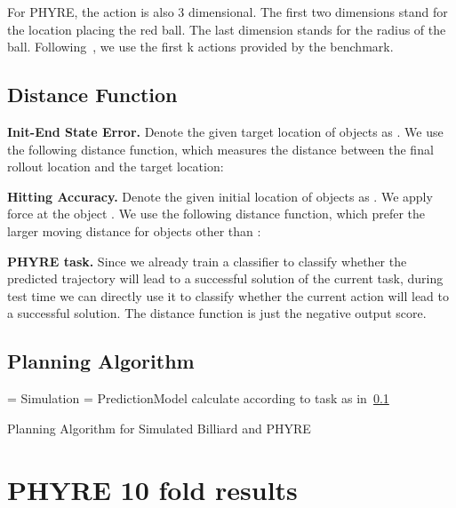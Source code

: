 \documentclass{article} \usepackage{iclr2021_conference,times}
\begin{document}
For PHYRE, the action is also 3 dimensional. The first two dimensions stand for the location placing the red ball. The last dimension stands for the radius of the ball. Following~\citep{bakhtin2019phyre}, we use the first k actions provided by the benchmark.

\subsection{Distance Function}
\label{sec:dist}

\textbf{Init-End State Error.} Denote the given target location of  objects as . We use the following distance function, which measures the distance between the final rollout location and the target location:
\vspace{-0.8em}

\vspace{-0.8em}

\textbf{Hitting Accuracy.} Denote the given initial location of  objects as . We apply force at the object . We use the following distance function, which prefer the larger moving distance for objects other than :
\vspace{-0.8em}

\vspace{-0.8em}

\textbf{PHYRE task.} 
Since we already train a classifier to classify whether the predicted trajectory will lead to a successful solution of the current task, during test time we can directly use it to classify whether the current action will lead to a successful solution. The distance function is just the negative output score.

\subsection{Planning Algorithm}

\begin{algorithm}[H]
\SetAlgoLined
{}
 {
   = Simulation \;
   = PredictionModel \;
  calculate  according to task as in~\ref{sec:dist}\;
  \If{} {
     \;
     \;
  }
}
\caption{Planning Algorithm for Simulated Billiard and PHYRE}
\label{alg:plan}
\end{algorithm}

\section{PHYRE 10 fold results}
\end{document}
